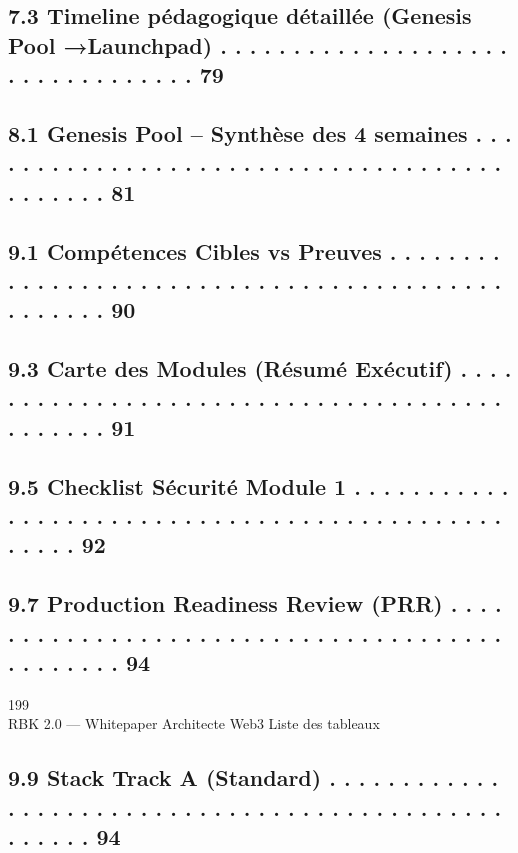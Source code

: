 \subsection{7.3 Timeline pédagogique détaillée (Genesis Pool →Launchpad) . . . . . . . . . . . . . . . . . . . . . . . . . . . . . . . . .          79}
\vspace{0.5em}
\subsection{8.1 Genesis Pool – Synthèse des 4 semaines . . . . . . . . . . . . . . . . . . . . . . . . . . . . . . . . . . . . . . . . . . . .      81}
\vspace{0.5em}
\subsection{9.1   Compétences Cibles vs Preuves . . . . . . . . . . . . . . . . . . . . . . . . . . . . . . . . . . . . . . . . . . . . . . . . .   90}
\subsection{9.3   Carte des Modules (Résumé Exécutif) . . . . . . . . . . . . . . . . . . . . . . . . . . . . . . . . . . . . . . . . . . . . .     91}
\subsection{9.5   Checklist Sécurité Module 1 . . . . . . . . . . . . . . . . . . . . . . . . . . . . . . . . . . . . . . . . . . . . . . . . . .   92}
\subsection{9.7   Production Readiness Review (PRR) . . . . . . . . . . . . . . . . . . . . . . . . . . . . . . . . . . . . . . . . . . . . . .     94}
\vspace{0.5em}
\vspace{0.5em}
\vspace{0.5em}
199\\
RBK 2.0 — Whitepaper Architecte Web3                                                                                          Liste des tableaux\\
\vspace{0.5em}
\vspace{0.5em}
\subsection{9.9 Stack Track A (Standard) . . . . . . . . . . . . . . . . . . . . . . . . . . . . . . . . . . . . . . . . . . . . . . . . . . . .      94}
